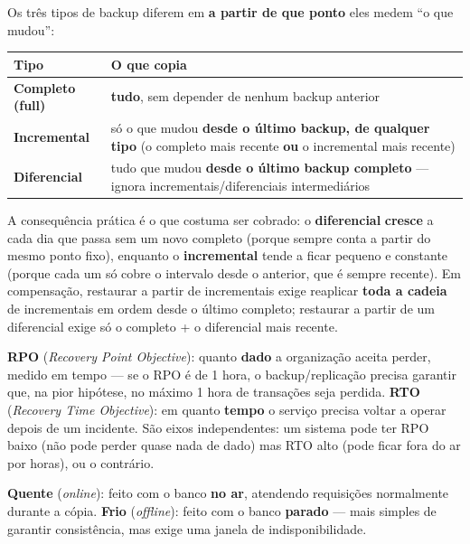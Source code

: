 \begin{conceito}
Os três tipos de backup diferem em \textbf{a partir de que ponto} eles
medem “o que mudou”:

\begin{center}
\begin{tabular}{@{}p{2.6cm}p{8.4cm}@{}}
\toprule
\textbf{Tipo} & \textbf{O que copia} \\
\midrule
\textbf{Completo (full)} & \textbf{tudo}, sem depender de nenhum backup
anterior \\
\textbf{Incremental} & só o que mudou \textbf{desde o último backup, de
qualquer tipo} (o completo mais recente \textbf{ou} o incremental mais
recente) \\
\textbf{Diferencial} & tudo que mudou \textbf{desde o último backup
completo} --- ignora incrementais/diferenciais intermediários \\
\bottomrule
\end{tabular}
\end{center}

A consequência prática é o que costuma ser cobrado: o \textbf{diferencial}
\textbf{cresce} a cada dia que passa sem um novo completo (porque sempre
conta a partir do mesmo ponto fixo), enquanto o \textbf{incremental} tende
a ficar pequeno e constante (porque cada um só cobre o intervalo desde o
anterior, que é sempre recente). Em compensação, restaurar a partir de
incrementais exige reaplicar \textbf{toda a cadeia} de incrementais em
ordem desde o último completo; restaurar a partir de um diferencial exige
só o completo + o diferencial mais recente.
\end{conceito}

\begin{conceito}
\textbf{RPO} (\textit{Recovery Point Objective}): quanto \textbf{dado} a
organização aceita perder, medido em tempo --- se o RPO é de 1 hora, o
backup/replicação precisa garantir que, na pior hipótese, no máximo 1 hora
de transações seja perdida. \textbf{RTO} (\textit{Recovery Time
Objective}): em quanto \textbf{tempo} o serviço precisa voltar a operar
depois de um incidente. São eixos independentes: um sistema pode ter RPO
baixo (não pode perder quase nada de dado) mas RTO alto (pode ficar fora do
ar por horas), ou o contrário.
\end{conceito}

\begin{conceito}
\textbf{Quente} (\textit{online}): feito com o banco \textbf{no ar},
atendendo requisições normalmente durante a cópia. \textbf{Frio}
(\textit{offline}): feito com o banco \textbf{parado} --- mais simples de
garantir consistência, mas exige uma janela de indisponibilidade.
\end{conceito}

